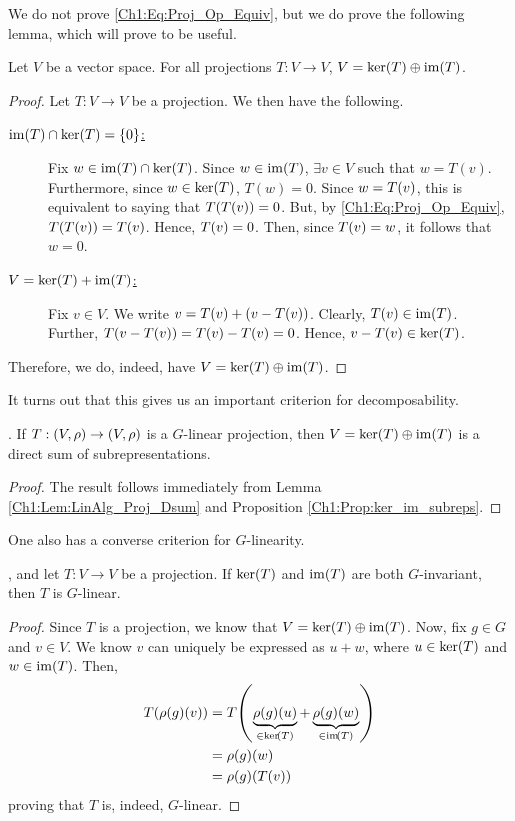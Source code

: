 We do not prove \eqref{Ch1:Eq:Proj_Op_Equiv}, but we do prove the following lemma, which will prove to be useful.

\begin{lemma} \label{Ch1:Lem:LinAlg_Proj_Dsum}
    Let $V$ be a vector space. For all projections $T : V \to V$, $V = \operatorname{ker}\!\left( T \right) \oplus \operatorname{im}\!\left( T \right)$.
\end{lemma}
\begin{proof}
    Let $T : V \to V$ be a projection. We then have the following.
    \begin{description}
        \item[\underline{$\operatorname{im}\!\left( T \right) \cap \operatorname{ker}\!\left( T \right) = \left\{ 0 \right\}$:}] Fix $w \in \operatorname{im}\!\left( T \right) \cap \operatorname{ker}\!\left( T \right)$. Since $w \in \operatorname{im}\!\left( T \right)$, $\exists v \in V$ such that $w = T(v)$. Furthermore, since $w \in \operatorname{ker}\!\left( T \right)$, $T(w) = 0$. Since $w = T\!\left( v \right)$, this is equivalent to saying that $T\!\left( T\!\left( v \right) \right) = 0$. But, by \eqref{Ch1:Eq:Proj_Op_Equiv}, $T\!\left( T\!\left( v \right) \right) = T\!\left( v \right)$. Hence, $T\!\left( v \right) = 0$. Then, since $T\!\left( v \right) = w$, it follows that $w = 0$.
        \item[\underline{$V = \operatorname{ker}\!\left( T \right) + \operatorname{im}\!\left( T \right)$:}] Fix $v \in V$. We write $v = T\!\left( v \right) + \left( v - T\!\left( v \right) \right)$. Clearly, $T\!\left( v \right) \in \operatorname{im}\!\left( T \right)$. Further, $T\!\left( v - T\!\left( v \right) \right) = T\!\left( v \right) - T\!\left( v \right) = 0$. Hence, $v - T\!\left( v \right) \in \operatorname{ker}\!\left( T \right)$.
    \end{description}
    Therefore, we do, indeed, have $V = \operatorname{ker}\!\left( T \right) \oplus \operatorname{im}\!\left( T \right)$.
\end{proof}

It turns out that this gives us an important criterion for decomposability.

\begin{corollary}\label{Ch1:Cor:G_lin_proj_ker_im}
    . If $T : \left( V, \rho \right) \to \left( V, \rho \right)$ is a $G$-linear projection, then $V = \operatorname{ker}\!\left( T \right) \oplus \operatorname{im}\!\left( T \right)$ is a direct sum of subrepresentations.
\end{corollary}
\begin{proof}
    The result follows immediately from Lemma \ref{Ch1:Lem:LinAlg_Proj_Dsum} and Proposition \ref{Ch1:Prop:ker_im_subreps}.
\end{proof}

One also has a converse criterion for $G$-linearity.

\begin{proposition} \label{Ch1:Prop:Proj_Inv_Lin}
    , and let $T : V \to V$ be a projection. If $\operatorname{ker}\!\left( T \right)$ and $\operatorname{im}\!\left( T \right)$ are both $G$-invariant, then $T$ is $G$-linear.
\end{proposition}
\begin{proof}
    Since $T$ is a projection, we know that $V = \operatorname{ker}\!\left( T \right) \oplus \operatorname{im}\!\left( T \right)$. Now, fix $g \in G$ and $v \in V$. We know $v$ can uniquely be expressed as $u + w$, where $u \in \operatorname{ker}\!\left( T \right)$ and $w \in \operatorname{im}\!\left( T \right)$. Then,
    \begin{align*}
        T\!\left( \rho(g)(v) \right) &= T\!\left( \underbrace{\rho(g)(u)}_{\in \operatorname{ker}\!\left( T \right)} + \underbrace{\rho(g)(w)}_{\in \operatorname{im}\!\left( T \right)} \right) \\
        &= \rho(g)(w) \\
        &= \rho(g)\!\left( T\!\left( v \right) \right)
    \end{align*}
    proving that $T$ is, indeed, $G$-linear.
\end{proof}

